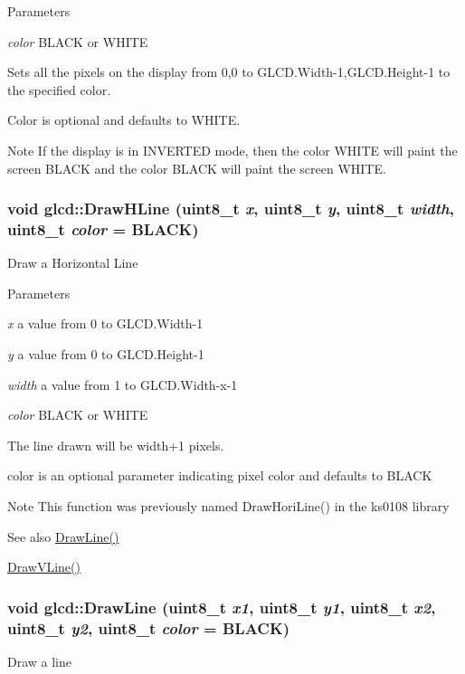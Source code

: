 \begin{DoxyParams}{Parameters}
\item[{\em color}]BLACK or WHITE\end{DoxyParams}
Sets all the pixels on the display from 0,0 to GLCD.Width-\/1,GLCD.Height-\/1 to the specified color.

Color is optional and defaults to WHITE.

\begin{DoxyNote}{Note}
If the display is in INVERTED mode, then the color WHITE will paint the screen BLACK and the color BLACK will paint the screen WHITE. 
\end{DoxyNote}
\hypertarget{classglcd_ad44a983103e20535558b69ba15504493}{
\subsubsection[{DrawHLine}]{\setlength{\rightskip}{0pt plus 5cm}void glcd::DrawHLine (uint8\_\-t {\em x}, \/  uint8\_\-t {\em y}, \/  uint8\_\-t {\em width}, \/  uint8\_\-t {\em color} = {\ttfamily BLACK})}}
\label{classglcd_ad44a983103e20535558b69ba15504493}
Draw a Horizontal Line


\begin{DoxyParams}{Parameters}
\item[{\em x}]a value from 0 to GLCD.Width-\/1 \item[{\em y}]a value from 0 to GLCD.Height-\/1 \item[{\em width}]a value from 1 to GLCD.Width-\/x-\/1 \item[{\em color}]BLACK or WHITE\end{DoxyParams}
The line drawn will be width+1 pixels.

color is an optional parameter indicating pixel color and defaults to BLACK

\begin{DoxyNote}{Note}
This function was previously named DrawHoriLine() in the ks0108 library
\end{DoxyNote}
\begin{DoxySeeAlso}{See also}
\hyperlink{classglcd_a2995efe72f737e151794898d0f3f784f}{DrawLine()} 

\hyperlink{classglcd_a93adb4256767b495b15fb326d6d2c01a}{DrawVLine()} 
\end{DoxySeeAlso}
\hypertarget{classglcd_a2995efe72f737e151794898d0f3f784f}{
\subsubsection[{DrawLine}]{\setlength{\rightskip}{0pt plus 5cm}void glcd::DrawLine (uint8\_\-t {\em x1}, \/  uint8\_\-t {\em y1}, \/  uint8\_\-t {\em x2}, \/  uint8\_\-t {\em y2}, \/  uint8\_\-t {\em color} = {\ttfamily BLACK})}}
\label{classglcd_a2995efe72f737e151794898d0f3f784f}
Draw a line


